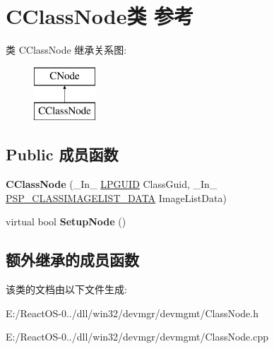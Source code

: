 \hypertarget{class_c_class_node}{}\section{C\+Class\+Node类 参考}
\label{class_c_class_node}
类 C\+Class\+Node 继承关系图\+:\begin{figure}[H]
\begin{center}
\leavevmode
\includegraphics[height=2.000000cm]{class_c_class_node}
\end{center}
\end{figure}
\subsection*{Public 成员函数}
\begin{DoxyCompactItemize}
\item 
\mbox{\label{class_c_class_node_a25f6271b7e31b8f8131b0593fa251e5a}} 
{\bfseries C\+Class\+Node} (\+\_\+\+In\+\_\+ \hyperlink{interface_g_u_i_d}{L\+P\+G\+U\+ID} Class\+Guid, \+\_\+\+In\+\_\+ \hyperlink{struct___s_p___c_l_a_s_s_i_m_a_g_e_l_i_s_t___d_a_t_a}{P\+S\+P\+\_\+\+C\+L\+A\+S\+S\+I\+M\+A\+G\+E\+L\+I\+S\+T\+\_\+\+D\+A\+TA} Image\+List\+Data)
\item 
\mbox{\label{class_c_class_node_a6631151f4647e4331c6f356df6791a33}} 
virtual bool {\bfseries Setup\+Node} ()
\end{DoxyCompactItemize}
\subsection*{额外继承的成员函数}


该类的文档由以下文件生成\+:\begin{DoxyCompactItemize}
\item 
E\+:/\+React\+O\+S-\/0../dll/win32/devmgr/devmgmt/Class\+Node.\+h\item 
E\+:/\+React\+O\+S-\/0../dll/win32/devmgr/devmgmt/Class\+Node.\+cpp\end{DoxyCompactItemize}
